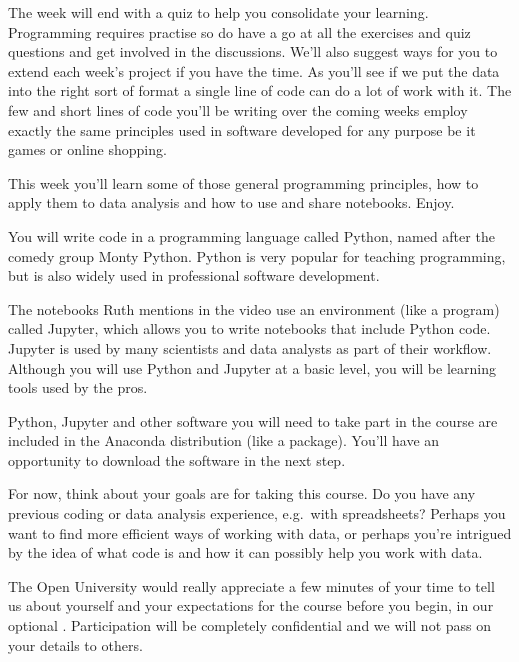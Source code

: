 \documentclass[letterpaper,10pt,english]{sphinxmanual}
\let\sphinxpxdimen\pdfpxdimen\else\newdimen\sphinxpxdimen
\begin{document}
The week will end with a quiz to help you consolidate your learning. Programming requires practise so do have a go at all the exercises and quiz questions and get involved in the discussions. We’ll also suggest ways for you to extend each week’s project if you have the time. As you’ll see if we put the data into the right sort of format a single line of code can do a lot of work with it. The few and short lines of code you’ll be writing over the coming weeks employ exactly the same principles
used in software developed for any purpose be it games or online shopping.

This week you’ll learn some of those general programming principles, how to apply them to data analysis and how to use and share notebooks. Enjoy.









\sphinxincludegraphics[width=512\sphinxpxdimen,height=288\sphinxpxdimen]{{ou_futurelearn_learn_to_code_vid_1001}.jpg} You will write code in a programming language called Python, named after the comedy group Monty Python. Python is very popular for teaching programming, but is also widely used in professional software development.

The notebooks Ruth mentions in the video use an environment (like a program) called Jupyter, which allows you to write notebooks that include Python code. Jupyter is used by many scientists and data analysts as part of their workflow. Although you will use Python and Jupyter at a basic level, you will be learning tools used by the pros.

Python, Jupyter and other software you will need to take part in the course are included in the Anaconda distribution (like a package). You’ll have an opportunity to download the software in the next step.

For now, think about your goals are for taking this course. Do you have any previous coding or data analysis experience, e.g. with spreadsheets? Perhaps you want to find more efficient ways of working with data, or perhaps you’re intrigued by the idea of what code is and how it can possibly help you work with data.

The Open University would really appreciate a few minutes of your time to tell us about yourself and your expectations for the course before you begin, in our optional . Participation will be completely confidential and we will not pass on your details to others.
\end{document}
